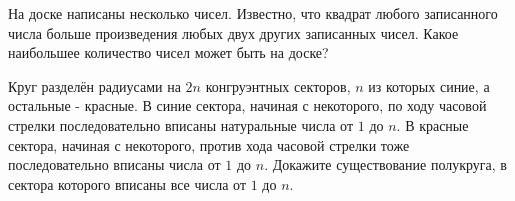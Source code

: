\documentclass[12pt]{article}
\begin{document}
\begin{task}
На доске написаны несколько чисел. Известно, что квадрат любого записанного числа больше произведения любых двух других записанных чисел. Какое наибольшее количество чисел может быть на доске?
\end{task}

\begin{task}
Круг разделён радиусами на $2n$ конгруэнтных секторов, $n$ из которых синие, а остальные - красные. В синие сектора, начиная с некоторого, по ходу часовой стрелки последовательно вписаны натуральные числа от $1$ до $n$. В красные сектора, начиная с некоторого, против хода часовой стрелки тоже последовательно вписаны числа от $1$ до $n$. Докажите существование полукруга, в сектора которого вписаны все числа от $1$ до $n$.
\end{task}
\end{document}
